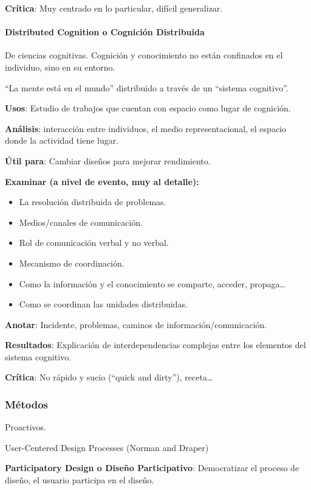 \documentclass[12pt, twoside, openright]{report} %
\begin{document}
\textbf{Crítica}: Muy centrado en lo particular, difícil generalizar.

\paragraph{Distributed Cognition o Cognición
	Distribuida}

De ciencias cognitivas. Cognición y conocimiento no están confinados en
el individuo, sino en su entorno.

\enquote{La mente está en el mundo} distribuido a través de un \enquote{sistema
cognitivo}.

\textbf{Usos}: Estudio de trabajos que cuentan con espacio como lugar de
cognición.

\textbf{Análisis}: interacción entre individuos, el medio
representacional, el espacio donde la actividad tiene lugar.

\textbf{Útil para}: Cambiar diseños para mejorar rendimiento.

\textbf{Examinar (a nivel de evento, muy al detalle):}

\begin{itemize}
	\item La resolución distribuida de problemas.
	\item Medios/canales de comunicación.
	\item Rol de comunicación verbal y no verbal.
	\item Mecanismo de coordinación.
	\item Como la información y el conocimiento se comparte, acceder, propaga\ldots{}
	\item Como se coordinan las unidades distribuidas.
\end{itemize}


\textbf{Anotar}: Incidente, problemas, caminos de
información/comunicación.

\textbf{Resultados}: Explicación de interdependencias complejas entre
los elementos del sistema cognitivo.

\textbf{Crítica}: No rápido y sucio (\enquote{quick and dirty}),
receta\ldots{}

\subsubsection{Métodos}

Proactivos.

User-Centered Design Processes (Norman and Draper)

\textbf{Participatory Design o Diseño Participativo}: Democratizar el
proceso de diseño, el usuario participa en el diseño.
\end{document}

